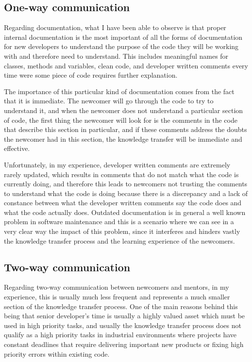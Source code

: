\documentclass[12pt, letterpaper]{article}
\begin{document}
\subsection{One-way communication}
Regarding documentation, what I have been able to observe is that proper internal documentation is the most 
important of all the forms of documentation for new developers to understand the purpose of the code they will
be working with and therefore need 
to understand. This includes meaningful names for classes, methods and variables, clean code, and developer written
comments every time were some piece of code requires further explanation.

The importance of this particular kind of documentation comes from the fact that it is immediate.
The newcomer will go through the code to try to understand it, and when the newcomer does not understand 
a particular section of code, the first thing the newcomer will look for is the comments in the code
that describe this section in particular, and if these comments address the doubts the newcomer had in this 
section, the knowledge transfer will be immediate and effective.

Unfortunately, in my experience, developer written comments are extremely rarely updated, which results in 
comments that do not match what the code is currently doing, and therefore this leads to newcomers not 
trusting the comments to understand what the code is doing because there is a discrepancy and a lack of 
constance between what the developer written comments say the code does and what the code actually does. 
Outdated documentation is in general a well known problem in software maintenance and this is a scenario
where we can see in a very clear way the impact of this problem, since it interferes and hinders vastly the 
knowledge transfer process and the learning experience of the newcomers.

\subsection{Two-way communication}
Regarding two-way communication between newcomers and mentors, in my experience, this is usually much less frequent and
represents a much smaller section of the knowledge transfer process. One of the main reasons behind this being that
senior developer's time is usually a highly valued asset which must be used in high priority tasks, and usually
the knowledge transfer process does not qualify as a high priority tasks in industrial environments where
projects have constant deadlines that require delivering important new products or fixing high priority errors
within existing code. 
\end{document}
